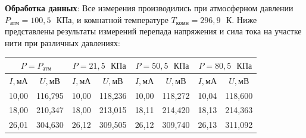 \documentclass[a4paper,12pt]{article}
\begin{document}
\textbf{Обработка данных}: Все измерения производились при атмосферном давлении $P_{атм} = 100,5 \text{ }КПа$, и комнатной температуре $T_{комн} = 296,9 \text{ }К$. Ниже представлены результаты измерений перепада напряжения и сила тока на участке нити при различных давлениях:
\begin{table}[H]\label{tab:p_s_atm}
    \centering
    \begin{tabular}{|cc|cc|cc|cc|}
        \hline
        \multicolumn{2}{|c|}{{\color[HTML]{000000} $P = P_{атм}$}} &
          \multicolumn{2}{c|}{{\color[HTML]{000000} $P = 21,5 \text{ }КПа$}} &
          \multicolumn{2}{c|}{{\color[HTML]{000000} $P = 50,5 \text{ }КПа$}} &
          \multicolumn{2}{c|}{{\color[HTML]{000000} $P = 80,5 \text{ }КПа$}} \\ \hline
        \multicolumn{1}{|c|}{{\color[HTML]{000000} $I, мА$}} &
          {\color[HTML]{000000} $U, мВ$} &
          \multicolumn{1}{c|}{{\color[HTML]{000000} $I, мА$}} &
          {\color[HTML]{000000} $U, мВ$} &
          \multicolumn{1}{c|}{{\color[HTML]{000000} $I, мА$}} &
          {\color[HTML]{000000} $U, мВ$} &
          \multicolumn{1}{c|}{{\color[HTML]{000000} $I, мА$}} &
          {\color[HTML]{000000} $U, мВ$} \\ \hline
        \multicolumn{1}{|c|}{{\color[HTML]{000000} 10,00}} &
          {\color[HTML]{000000} 116,795} &
          \multicolumn{1}{c|}{{\color[HTML]{000000} 10,00}} &
          {\color[HTML]{000000} 118,236} &
          \multicolumn{1}{c|}{{\color[HTML]{000000} 10,00}} &
          {\color[HTML]{000000} 118,272} &
          \multicolumn{1}{c|}{{\color[HTML]{000000} 10,04}} &
          {\color[HTML]{000000} 118,600} \\ \hline
        \multicolumn{1}{|c|}{{\color[HTML]{000000} 18,00}} &
          {\color[HTML]{000000} 210,347} &
          \multicolumn{1}{c|}{{\color[HTML]{000000} 18,00}} &
          {\color[HTML]{000000} 213,015} &
          \multicolumn{1}{c|}{{\color[HTML]{000000} 18,11}} &
          {\color[HTML]{000000} 214,420} &
          \multicolumn{1}{c|}{{\color[HTML]{000000} 18,13}} &
          {\color[HTML]{000000} 214,363} \\ \hline
        \multicolumn{1}{|c|}{{\color[HTML]{000000} 26,01}} &
          {\color[HTML]{000000} 304,630} &
          \multicolumn{1}{c|}{{\color[HTML]{000000} 26,12}} &
          {\color[HTML]{000000} 309,505} &
          \multicolumn{1}{c|}{{\color[HTML]{000000} 26,12}} &
          {\color[HTML]{000000} 309,740} &
          \multicolumn{1}{c|}{{\color[HTML]{000000} 26,13}} &
          {\color[HTML]{000000} 311,092} \\ \hline

\end{tabular}
\end{table}
\end{document}
